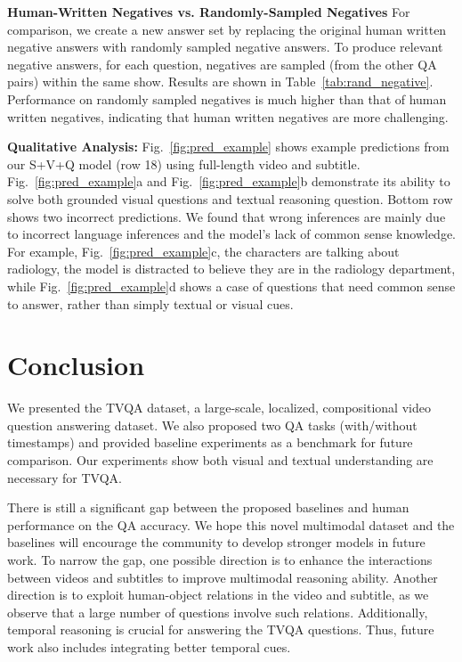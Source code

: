 \documentclass[11pt,a4paper]{article}
\begin{document}
\noindent\textbf{Human-Written Negatives vs. Randomly-Sampled Negatives} For comparison, we create a new answer set by replacing the original human written negative answers with randomly sampled negative answers. To produce relevant negative answers, for each question, negatives are sampled (from the other QA pairs) within the same show. 
Results are shown in Table~\ref{tab:rand_negative}. 
Performance on randomly sampled negatives is much higher than that of human written negatives, indicating that human written negatives are more challenging.



\noindent\textbf{Qualitative Analysis:} 
Fig.~\ref{fig:pred_example} shows example predictions from our S+V+Q model (row 18) using full-length video and subtitle. 
Fig.~\ref{fig:pred_example}a and Fig.~\ref{fig:pred_example}b demonstrate its ability to solve both grounded visual questions and textual reasoning question. 
Bottom row shows two incorrect predictions. 
We found that wrong inferences are mainly due to incorrect language inferences and the model's lack of common sense knowledge. 
For example, Fig.~\ref{fig:pred_example}c, the characters are talking about radiology, the model is distracted to believe they are in the radiology department, while Fig.~\ref{fig:pred_example}d shows a case of questions that need common sense to answer, rather than simply textual or visual cues.

 \section{Conclusion}

We presented the TVQA dataset, a large-scale, localized, compositional video question answering dataset.  
We also proposed two QA tasks (with/without timestamps) and provided baseline experiments as a benchmark for future comparison.
Our experiments show both visual and textual understanding are necessary for TVQA. 

There is still a significant gap between the proposed baselines and human performance on the QA accuracy. 
We hope this novel multimodal dataset and the baselines will encourage the community to develop stronger models in future work. 
To narrow the gap, one possible direction is to enhance the interactions between videos and subtitles to improve multimodal reasoning ability. 
Another direction is to exploit human-object relations in the video and subtitle, as we observe that a large number of questions involve such relations. 
Additionally, temporal reasoning is crucial for answering the TVQA questions. 
Thus, future work also includes integrating better temporal cues.
\end{document}
